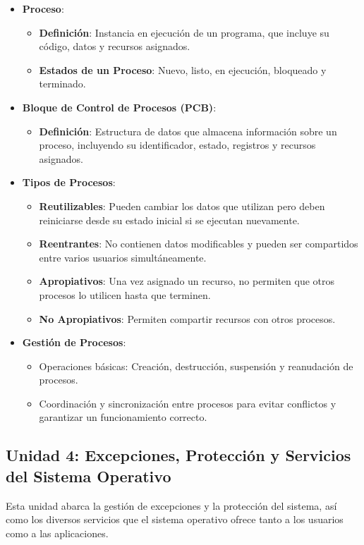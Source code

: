 \begin{itemize}
	\item \textbf{Proceso}:
	\begin{itemize}
		\item \textbf{Definición}: Instancia en ejecución de un programa, que incluye su código, datos y recursos asignados.
		\item \textbf{Estados de un Proceso}: Nuevo, listo, en ejecución, bloqueado y terminado.
	\end{itemize}
	
	\item \textbf{Bloque de Control de Procesos (PCB)}:
	\begin{itemize}
		\item \textbf{Definición}: Estructura de datos que almacena información sobre un proceso, incluyendo su identificador, estado, registros y recursos asignados.
	\end{itemize}
	
	\item \textbf{Tipos de Procesos}:
	\begin{itemize}
		\item \textbf{Reutilizables}: Pueden cambiar los datos que utilizan pero deben reiniciarse desde su estado inicial si se ejecutan nuevamente.
		\item \textbf{Reentrantes}: No contienen datos modificables y pueden ser compartidos entre varios usuarios simultáneamente.
		\item \textbf{Apropiativos}: Una vez asignado un recurso, no permiten que otros procesos lo utilicen hasta que terminen.
		\item \textbf{No Apropiativos}: Permiten compartir recursos con otros procesos.
	\end{itemize}
	
	\item \textbf{Gestión de Procesos}:
	\begin{itemize}
		\item Operaciones básicas: Creación, destrucción, suspensión y reanudación de procesos.
		\item Coordinación y sincronización entre procesos para evitar conflictos y garantizar un funcionamiento correcto.
	\end{itemize}
\end{itemize}

\subsection{Unidad 4: Excepciones, Protección y Servicios del Sistema Operativo}
Esta unidad abarca la gestión de excepciones y la protección del sistema, así como los diversos servicios que el sistema operativo ofrece tanto a los usuarios como a las aplicaciones.

